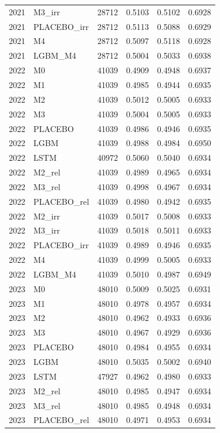 \begin{tabular}{llrrrr}
2021 & M3\_irr & 28712 & 0.5103 & 0.5102 & 0.6928 \\
2021 & PLACEBO\_irr & 28712 & 0.5113 & 0.5088 & 0.6929 \\
2021 & M4 & 28712 & 0.5097 & 0.5118 & 0.6928 \\
2021 & LGBM\_M4 & 28712 & 0.5004 & 0.5033 & 0.6938 \\
2022 & M0 & 41039 & 0.4909 & 0.4948 & 0.6937 \\
2022 & M1 & 41039 & 0.4985 & 0.4944 & 0.6935 \\
2022 & M2 & 41039 & 0.5012 & 0.5005 & 0.6933 \\
2022 & M3 & 41039 & 0.5004 & 0.5005 & 0.6933 \\
2022 & PLACEBO & 41039 & 0.4986 & 0.4946 & 0.6935 \\
2022 & LGBM & 41039 & 0.4988 & 0.4984 & 0.6950 \\
2022 & LSTM & 40972 & 0.5060 & 0.5040 & 0.6934 \\
2022 & M2\_rel & 41039 & 0.4989 & 0.4965 & 0.6934 \\
2022 & M3\_rel & 41039 & 0.4998 & 0.4967 & 0.6934 \\
2022 & PLACEBO\_rel & 41039 & 0.4980 & 0.4942 & 0.6935 \\
2022 & M2\_irr & 41039 & 0.5017 & 0.5008 & 0.6933 \\
2022 & M3\_irr & 41039 & 0.5018 & 0.5011 & 0.6933 \\
2022 & PLACEBO\_irr & 41039 & 0.4989 & 0.4946 & 0.6935 \\
2022 & M4 & 41039 & 0.4999 & 0.5005 & 0.6933 \\
2022 & LGBM\_M4 & 41039 & 0.5010 & 0.4987 & 0.6949 \\
2023 & M0 & 48010 & 0.5009 & 0.5025 & 0.6931 \\
2023 & M1 & 48010 & 0.4978 & 0.4957 & 0.6934 \\
2023 & M2 & 48010 & 0.4962 & 0.4933 & 0.6936 \\
2023 & M3 & 48010 & 0.4967 & 0.4929 & 0.6936 \\
2023 & PLACEBO & 48010 & 0.4984 & 0.4955 & 0.6934 \\
2023 & LGBM & 48010 & 0.5035 & 0.5002 & 0.6940 \\
2023 & LSTM & 47927 & 0.4962 & 0.4980 & 0.6933 \\
2023 & M2\_rel & 48010 & 0.4985 & 0.4947 & 0.6934 \\
2023 & M3\_rel & 48010 & 0.4985 & 0.4948 & 0.6934 \\
2023 & PLACEBO\_rel & 48010 & 0.4971 & 0.4953 & 0.6934 \\

\end{tabular}
